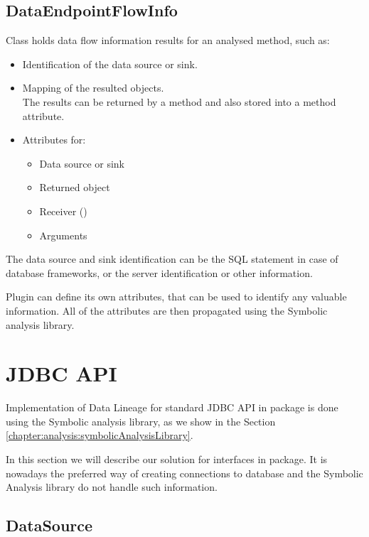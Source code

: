 \subsection{DataEndpointFlowInfo}

Class  holds data flow information results
for an analysed method, such as:
\begin{itemize}
  \item Identification of the data source or sink.
  \item Mapping of the resulted objects. \\
    The results can be returned by a method and also stored into a method attribute.
  \item Attributes for:
    \begin{itemize}
      \item Data source or sink
      \item Returned object
      \item Receiver ()
      \item Arguments
    \end{itemize}
\end{itemize}

The data source and sink identification can be the SQL statement in case of database frameworks,
or the server identification or other information.

Plugin can define its own attributes, that can be used to identify any valuable information.
All of the attributes are then propagated using the Symbolic analysis library.




\section{JDBC API \label{implementation:jdbc}}

Implementation of Data Lineage for standard JDBC API in  package
is done using the Symbolic analysis library, as we show in the Section \ref{chapter:analysis:symbolicAnalysisLibrary}.

In this section we will describe our solution for  interfaces in  package.
It is nowadays the preferred way of creating connections to database and the Symbolic Analysis
library do not handle such information.



\subsection{DataSource \label{implementation:dataSource}}

